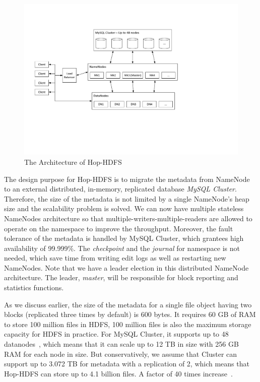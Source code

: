 \begin{figure}[h!]
	\centering
	\includegraphics[scale=0.7]{figs/HopHDFSArchitecture.pdf}
	\caption{The Architecture of Hop-HDFS}
	\label{fig:hophdfsarchitecture}
\end{figure}

\noindent The design purpose for Hop-HDFS is to migrate the metadata from NameNode to an external distributed, in-memory, replicated database \textit{MySQL Cluster}. Therefore, the size of the metadata is not limited by a single NameNode's heap size and the scalability problem is solved. We can now have multiple stateless NameNodes architecture so that multiple-writers-multiple-readers are allowed to operate on the namespace to improve the throughput. Moreover, the fault tolerance of the metadata is handled by MySQL Cluster, which grantees high availability of 99.999\%. The \textit{checkpoint} and the \textit{journal} for namespace is not needed, which save time from writing edit logs as well as restarting new NameNodes. Note that we have a leader election in this distributed NameNode architecture. The leader, \textit{master}, will be responsible for block reporting and statistics functions.

\noindent As we discuss earlier, the size of the metadata for a single file object having two blocks (replicated three times by default) is 600 bytes. It requires 60 GB of RAM to store 100 million files in HDFS, 100 million files is also the maximum storage capacity for HDFS in practice. For MySQL Cluster, it supports up to 48 datanodes~\cite{mysql48nodes}, which means that it can scale up to 12 TB in size with 256 GB RAM for each node in size. But conservatively, we assume that Cluster can support up to 3.072 TB for metadata with a replication of 2, which means that Hop-HDFS can store up to 4.1 billion files. A factor of 40 times increase~\cite{hakimzadeh2014scaling}. 


